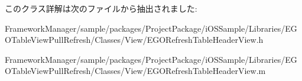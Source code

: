このクラス詳解は次のファイルから抽出されました\+:\begin{DoxyCompactItemize}
\item 
Framework\+Manager/sample/packages/\+Project\+Package/i\+O\+S\+Sample/\+Libraries/\+E\+G\+O\+Table\+View\+Pull\+Refresh/\+Classes/\+View/E\+G\+O\+Refresh\+Table\+Header\+View.\+h\item 
Framework\+Manager/sample/packages/\+Project\+Package/i\+O\+S\+Sample/\+Libraries/\+E\+G\+O\+Table\+View\+Pull\+Refresh/\+Classes/\+View/E\+G\+O\+Refresh\+Table\+Header\+View.\+m\end{DoxyCompactItemize}
